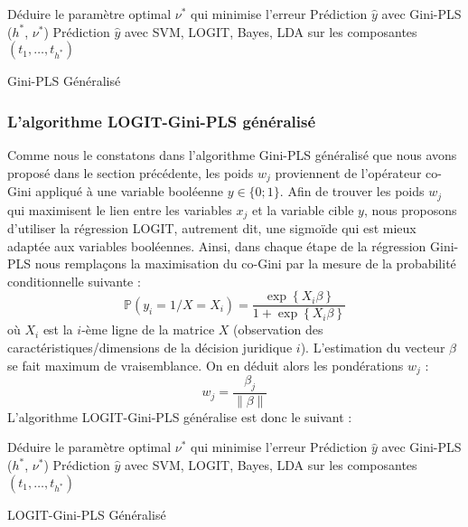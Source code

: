 \begin{algorithm}[h]
	\scriptsize
	Déduire le paramètre optimal $\nu^*$ qui minimise l'erreur \; 
	\Return Prédiction $\hat{y}$ avec Gini-PLS ($h^*$, $\nu^*$) \;
	\Return Prédiction $\hat{y}$ avec SVM, LOGIT, Bayes, LDA sur les composantes $(t_1,\ldots,t_{h^*})$\;
	\caption{Gini-PLS Généralisé}\label{G-GPLS}
\end{algorithm}
\bigskip

\subsubsection{L'algorithme LOGIT-Gini-PLS généralisé} 
\label{sec:sensresultat:logit-gini-pls}
Comme nous le constatons dans l'algorithme Gini-PLS généralisé que nous avons proposé dans le section précédente, les poids $w_j$ proviennent de l'opérateur co-Gini appliqué à une variable booléenne $y \in \lbrace 0;1 \rbrace$. Afin de trouver les poids $w_j$ qui maximisent le lien entre les variables $x_j$ et la variable cible $y$, nous proposons d'utiliser la régression LOGIT, autrement dit, une sigmoïde qui est mieux adaptée aux variables booléennes. Ainsi, dans chaque étape de la régression Gini-PLS nous remplaçons la maximisation du co-Gini par la mesure de la probabilité conditionnelle suivante :
\begin{equation}\tag{LOGIT}
\mathbb{P}(y_i = 1 / X = X_i) = \frac{\exp\left\{X_i \beta \right\}}{1+\exp\left\{ X_i \beta \right\}}
\end{equation}
où $X_i$ est la $i$-ème ligne de la matrice $X$ (observation des caractéristiques/dimensions de la décision juridique $i$). L'estimation du vecteur $\beta$ se fait maximum de vraisemblance. On en déduit alors les pondérations $w_j$ :
\[
w_j = \frac{\beta_j}{\| \beta\|}
\]
L'algorithme LOGIT-Gini-PLS généralise est donc le suivant :

\begin{algorithm}[h]
	\scriptsize
	Déduire le paramètre optimal $\nu^*$ qui minimise l'erreur \; 
	\Return Prédiction $\hat{y}$ avec Gini-PLS ($h^*$, $\nu^*$) \;
	\Return Prédiction $\hat{y}$ avec SVM, LOGIT, Bayes, LDA sur les composantes $(t_1,\ldots,t_{h^*})$\;
	\caption{LOGIT-Gini-PLS Généralisé}\label{LG-GPLS}
\end{algorithm}

